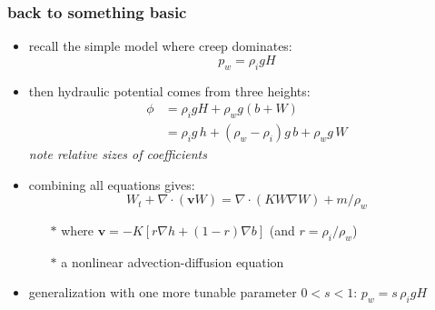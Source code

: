 \documentclass[hide notes,intlimits]{beamer}
\begin{document}
\begin{frame}
  \frametitle{back to something basic}

  \begin{itemize}
    \item recall the simple model where creep dominates:
    		$$p_w = \rho_i g H$$
    \item then hydraulic potential comes from three heights:
    \begin{align*}
      \phi &= \rho_i g H + \rho_w g (b+W) \\
           &= \rho_i g \,h + (\rho_w - \rho_i) g \,b + \rho_w g \,W
    \end{align*}
    \emph{note relative sizes of coefficients}
    \item<2-3> combining all equations gives:
       $$\boxed{W_t + \nabla\cdot\left(\mathbf{v} W\right) = \nabla \cdot(K W \nabla W) + m / \rho_w}$$
      \begin{itemize}
      \vspace{-3mm}
      \item[$\ast$] where $\mathbf{v} = - K \left[r \nabla h + (1-r) \nabla b\right]$  \qquad (and $r = \rho_i/\rho_w$)
      \item[$\ast$] a nonlinear advection-diffusion equation
      \end{itemize}
    \item<3> \scriptsize generalization with one more tunable parameter $0<s<1$: \quad $p_w = s\, \rho_i g H$
  \end{itemize}
\end{frame}
\end{document}
